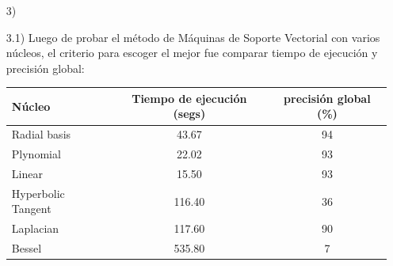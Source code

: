 \documentclass[11pt,a4paper]{report}
\begin{document}
\begin{itemize}
\item[3)]
\item[3.1)] Luego de probar el método de Máquinas de Soporte Vectorial con varios núcleos, el criterio para escoger el mejor fue comparar tiempo de ejecución y precisión global:\\

\begin{tabular}{|l|c|c|}
\hline 
Núcleo & Tiempo de ejecución (segs) & precisión global (\%)\\
\hline
Radial basis & 43.67 & 94 \\
\hline 
Plynomial & 22.02 & 93 \\
\hline 
Linear & 15.50 & 93 \\
\hline 
Hyperbolic Tangent & 116.40 & 36 \\
\hline 
Laplacian & 117.60 & 90 \\
\hline
Bessel & 535.80 & 7 \\
\hline
\end{tabular} \\


\end{itemize}
\end{document}
